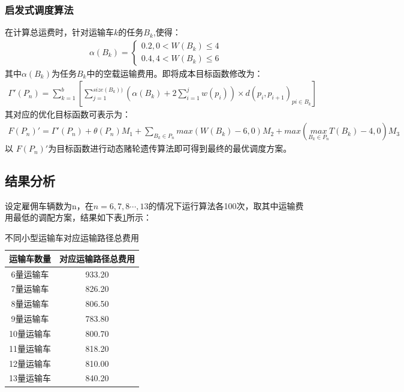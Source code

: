 \documentclass{whutmod}
\begin{document}
  \subsubsection{启发式调度算法}
  在计算总运费时，针对运输车$k$的任务$B_k$,使得：
  \begin{gather}
  \alpha (B_k)=\left\{\begin{matrix}0.2,0<W(B_k)\leqslant4
  \\ 0.4,4<W(B_k)\leqslant6
  \end{matrix}\right.
  \end{gather}
  其中$\alpha (B_k)$为任务$B_k$中的空载运输费用。即将成本目标函数修改为：
  \begin{gather}
  \Gamma '(P_n)=\sum _{k=1}^b[\sum _{j=1}^{size(B_k))}(\alpha (B_k)+2\sum _{i=1}^jw(p_i))\times d(p_i,p_{i+1})_{pi\in B_k}]
  \end{gather}
  其对应的优化目标函数可表示为：
  \begin{gather}
  F(P_n)'= \Gamma '(P_n)+\theta(P_n)M_1+\sum_{B_k\in P_n}max( W (B_k)-6 ,0) M_2+max(\underset{B_k\in P_n}{max}T (B_k)-4,0)M_3
  \end{gather}
  以  $F(P_n)'$为目标函数进行动态赌轮遗传算法即可得到最终的最优调度方案。
  \subsection{结果分析}
  设定雇佣车辆数为n，在$n=6,7,8\cdots,13$的情况下运行算法各100次，取其中运输费用最低的调配方案，结果如下表\ref{zhussanssssasgzai}所示：
  
  	\begin{table}[H]
	\centering		
	\caption{不同小型运输车对应运输路径总费用}\label{zhussanssssasgzai}
	\begin{tabular}{cc}
		\toprule[2pt]
		\multicolumn{1}{m{5cm}}{\centering 运输车数量}
		& \multicolumn{1}{m{5cm}}{\centering 对应运输路径总费用}
		\\
		\midrule[1pt]
		6量运输车 &   933.20\\ 
		7量运输车 & 	826.20\\ 
		8量运输车 &  806.50 \\ 
		9量运输车 &  783.80\\ 
		10量运输车 &  	800.70\\ 
		11量运输车 & 818.20 \\ 
		12量运输车 &810.00\\ 
		13量运输车 & 840.20\\ 
		\bottomrule[2pt]	
	\end{tabular}
\end{table}
  
\end{document}
